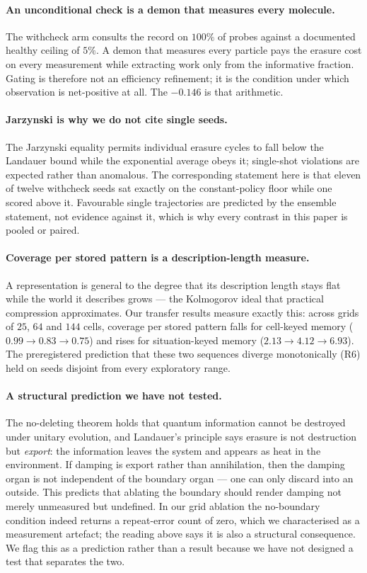 \documentclass[11pt]{article}
\begin{document}
\paragraph{An unconditional check is a demon that measures every molecule.}
The withcheck arm consults the record on $100\%$ of probes against a documented
healthy ceiling of $5\%$. A demon that measures every particle pays the erasure
cost on every measurement while extracting work only from the informative
fraction. Gating is therefore not an efficiency refinement; it is the condition
under which observation is net-positive at all. The $-0.146$ is that
arithmetic.

\paragraph{Jarzynski is why we do not cite single seeds.} The Jarzynski
equality permits individual erasure cycles to fall below the Landauer bound
while the exponential average obeys it; single-shot violations are expected
rather than anomalous. The corresponding statement here is that eleven of
twelve withcheck seeds sat exactly on the constant-policy floor while one
scored above it. Favourable single trajectories are predicted by the ensemble
statement, not evidence against it, which is why every contrast in this paper
is pooled or paired.

\paragraph{Coverage per stored pattern is a description-length measure.} A
representation is general to the degree that its description length stays flat
while the world it describes grows --- the Kolmogorov ideal that practical
compression approximates. Our transfer results measure exactly this: across
grids of $25$, $64$ and $144$ cells, coverage per stored pattern falls for
cell-keyed memory ($0.99 \to 0.83 \to 0.75$) and rises for situation-keyed
memory ($2.13 \to 4.12 \to 6.93$). The preregistered prediction that these two
sequences diverge monotonically (R6) held on seeds disjoint from every
exploratory range.

\paragraph{A structural prediction we have not tested.} The no-deleting theorem
holds that quantum information cannot be destroyed under unitary evolution, and
Landauer's principle says erasure is not destruction but \emph{export}: the
information leaves the system and appears as heat in the environment. If
damping is export rather than annihilation, then the damping organ is not
independent of the boundary organ --- one can only discard into an outside.
This predicts that ablating the boundary should render damping not merely
unmeasured but undefined. In our grid ablation the no-boundary condition indeed
returns a repeat-error count of zero, which we characterised as a measurement
artefact; the reading above says it is also a structural consequence. We flag
this as a prediction rather than a result because we have not designed a test
that separates the two.
\end{document}
